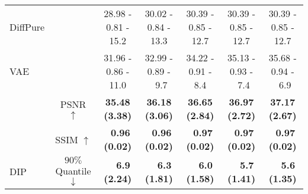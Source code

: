 \begin{table*}[!tb]
{\begin{tabular}{l c ccccc}
\rowcolor{Gray}
{DiffPure} & & {28.98 - 0.81 - 15.2} & {30.02 - 0.84 - 13.3} & {30.39 - 0.85 - 12.7} & {30.39 - 0.85 - 12.7} & {30.39 - 0.85 - 12.7}\\

{VAE} & & {31.96 - 0.86 - 11.0} & {32.99 - 0.89 - ~9.7} & {34.22 - 0.91 - 8.4} & {35.13 - 0.93 - ~7.4} & {35.68 - 0.94 - ~6.9}\\

\rowcolor{Gray}
& \small{PSNR $\uparrow$} & \textbf{\small{35.48 \small{(3.38)}}} & \textbf{\small{36.18 \small{(3.06)}}} & \textbf{\small{36.65 \small{(2.84)}}} & \textbf{\small{36.97 \small{(2.72)}}} & \textbf{\small{37.17 \small{(2.67)}}}\\
\rowcolor{Gray}
& \small{SSIM $\uparrow$} & \textbf{\small{~0.96 \small{(0.02)}}} & \textbf{\small{~0.96 \small{(0.02)}}} & \textbf{\small{~0.97 \small{(0.02)}}} & \textbf{\small{~0.97 \small{(0.02)}}} & \textbf{\small{~0.97 \small{(0.02)}}}\\
\rowcolor{Gray}
\small{DIP} & \small{$90\%$ Quantile $\downarrow$} & \textbf{\small{~~6.9 \small{(2.24)}}} & \textbf{\small{~~6.3 \small{(1.81)}}} & \textbf{\small{~~6.0 \small{(1.58)}}} & \textbf{\small{~~5.7 \small{(1.41)}}} & \textbf{\small{~~5.6 \small{(1.35)}}}\\


\end{tabular}}
\end{table*}
